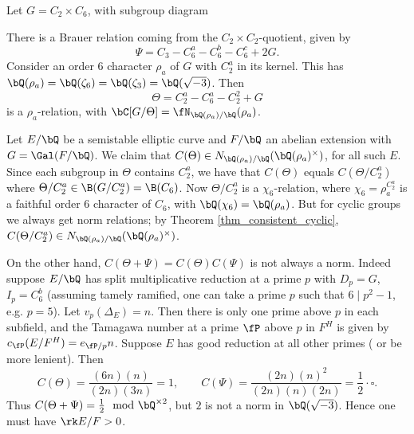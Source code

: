 \begin{example}
    Let $G = C_2 \times C_6$, with subgroup diagram
    \begin{figure}[H]
        \centering
    \end{figure}
    There is a Brauer relation coming from the $C_2 \times C_2$-quotient, given by $$\Psi = C_3 - C_6^a - C_6^b - C_6^c + 2G.$$ Consider an order $6$ character $\rho_a$ of $G$ with $C_2^{a}$ in its kernel. This has $\bQ(\rho_a) = \bQ(\zeta_6) = \bQ(\zeta_3) = \bQ(\sqrt{-3})$. Then $$\Theta = C_2^{a} - C_6^{a} - C_2^{2} + G$$ is a $\rho_a$-relation, with $\bC[ G / \Theta] = \repnorm{\rho_a}$. 

    Let $E / \bQ$ be a semistable elliptic curve and $F / \bQ$ an abelian extension with $G = \Gal(F / \bQ)$. We claim that $C(\Theta) \in \fieldnorm{\rho_a}$, for all such $E$. Since each subgroup in $\Theta$ contains $C_2^{a}$, we have that $C(\Theta)$ equals $C(\Theta / C_2^{a})$ where $\Theta / C_2^{a} \in \B(G / C_2^{a}) = \B(C_6)$.  Now $\Theta / C_2^{a}$ is a $\chi_6$-relation, where $\chi_6 = \rho_a^{C_2^a}$ is a faithful order $6$ character of $C_6$, with $\bQ(\chi_6) = \bQ(\rho_a)$. But for cyclic groups we always get norm relations; by Theorem \ref{thm_consistent_cyclic}, $C(\Theta / C_2^{a}) \in \fieldnorm{\rho_a}$.

    On the other hand, $C(\Theta + \Psi) = C(\Theta)C(\Psi)$ is not always a norm. Indeed suppose $E / \bQ$ has split multiplicative reduction at a prime $p$ with $D_p = G$, $I_p = C_6^b$ (assuming tamely ramified, one can take a prime $p$ such that $6 \mid p^2 - 1$, e.g. $p = 5$). Let $v_p(\Delta_E) = n$. Then there is only one prime above $p$ in each subfield, and the Tamagawa number at a prime $\fP$ above $p$ in $F^H$ is given by $c_{\fP}(E / F^H) = e_{\fP / p} n$. Suppose $E$ has good reduction at all other primes ({\color{red} or be more lenient}).
     Then 
        $$C(\Theta) = \frac{(6n)(n)}{(2n) (3n)} = 1, \qquad
            C(\Psi) = \frac{(2n)(n)^2}{(2n)(n)(2n)} = \frac{1}{2} \cdot \square.$$
    Thus $C(\Theta + \Psi) = \frac{1}{2} \mod \bQ^{\times 2}$, but $2$ is not a norm in $\bQ(\sqrt{-3})$. Hence one must have $\rk E / F > 0$. 
\end{example}

